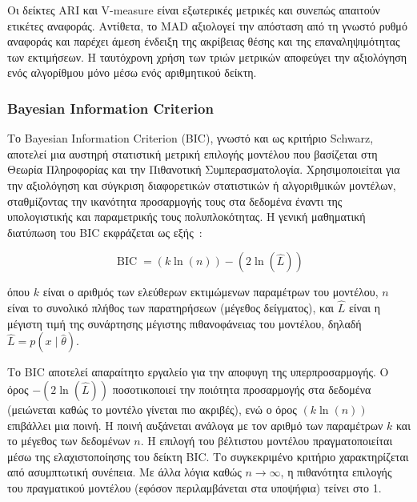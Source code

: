 Οι δείκτες \textenglish{ARI} και \textenglish{V-measure} είναι εξωτερικές μετρικές και συνεπώς απαιτούν ετικέτες αναφοράς. Αντίθετα, το \textenglish{MAD} αξιολογεί την απόσταση από τη γνωστό ρυθμό αναφοράς και παρέχει άμεση ένδειξη της ακρίβειας θέσης και της επαναληψιμότητας των εκτιμήσεων. Η ταυτόχρονη χρήση των τριών μετρικών αποφεύγει την αξιολόγηση ενός αλγορίθμου μόνο μέσω ενός αριθμητικού δείκτη.

\subsubsection{Bayesian Information Criterion}

Το \textenglish{Bayesian Information Criterion} (BIC), γνωστό και ως κριτήριο Schwarz, αποτελεί μια αυστηρή στατιστική μετρική επιλογής μοντέλου που βασίζεται στη Θεωρία Πληροφορίας και την Πιθανοτική Συμπερασματολογία. Χρησιμοποιείται για την αξιολόγηση και σύγκριση διαφορετικών στατιστικών ή αλγοριθμικών μοντέλων, σταθμίζοντας την ικανότητα προσαρμογής τους στα δεδομένα έναντι της υπολογιστικής και παραμετρικής τους πολυπλοκότητας. Η γενική μαθηματική διατύπωση του BIC εκφράζεται ως εξής~\cite{bic2002}:

\begin{equation}
\operatorname{BIC}=\left(k\ln(n)\right)-\left(2\ln(\widehat{L})\right)
\label{eq:bic}
\end{equation}

όπου $k$ είναι ο αριθμός των ελεύθερων εκτιμώμενων παραμέτρων του μοντέλου, $n$ είναι το συνολικό πλήθος των παρατηρήσεων (μέγεθος δείγματος), και $\widehat{L}$ είναι η μέγιστη τιμή της συνάρτησης μέγιστης πιθανοφάνειας του μοντέλου, δηλαδή $\widehat{L}=p(x\mid\widehat{\theta})$.

Tο BIC αποτελεί απαραίτητο εργαλείο για την αποφυγη της υπερπροσαρμογής. Ο όρος $-\left(2\ln(\widehat{L})\right)$ ποσοτικοποιεί την ποιότητα προσαρμογής στα δεδομένα (μειώνεται καθώς το μοντέλο γίνεται πιο ακριβές), ενώ ο όρος $\left(k\ln(n)\right)$ επιβάλλει μια ποινή. Η ποινή αυξάνεται ανάλογα με τον αριθμό των παραμέτρων $k$ και το μέγεθος των δεδομένων $n$. Η επιλογή του βέλτιστου μοντέλου πραγματοποιείται μέσω της ελαχιστοποίησης του δείκτη BIC. Το συγκεκριμένο κριτήριο χαρακτηρίζεται από ασυμπτωτική συνέπεια. Με άλλα λόγια καθώς $n \to \infty$, η πιθανότητα επιλογής του πραγματικού μοντέλου (εφόσον περιλαμβάνεται στα υποψήφια) τείνει στο 1.
